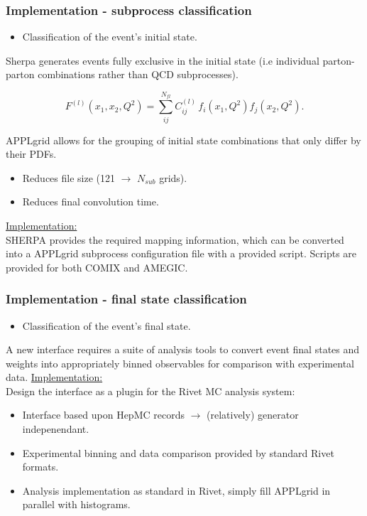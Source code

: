 \documentclass[10pt]{beamer}
\newcommand{\be}{\begin{equation*}}
\newcommand{\ee}{\end{equation*}}
\newcommand{\vso}{\vskip15pt}
\begin{document}
\begin{frame}
\frametitle{Implementation - subprocess classification}

\begin{itemize}
\item<1-> Classification of the event's initial state.
\end{itemize}

Sherpa generates events fully exclusive in the initial state
(i.e individual parton-parton combinations rather than QCD subprocesses).

\be F^{(l)}\left(x_1,x_2,Q^2\right) = \sum_{ij}^{N_{fl}} C^{(l)}_{ij} \, f_i\left(x_1,Q^2\right) f_j\left(x_2,Q^2\right). \ee

APPLgrid allows for the grouping of initial state combinations that only differ by their PDFs. 

\begin{itemize}
\item<1-> Reduces file size (121 $\to$ $N_{sub}$ grids).
\item<1-> Reduces final convolution time.
\end{itemize}
\vskip10pt

\underline{Implementation:}\\
\vskip4pt
SHERPA provides the required mapping information, which can be converted into
a APPLgrid subprocess configuration file with a provided script. Scripts are provided for both COMIX and AMEGIC.

\end{frame}

\begin{frame}
\frametitle{Implementation - final state classification}

\begin{itemize}
\item<1-> Classification of the event's final state.
\end{itemize}
\vskip10pt
A new interface requires a suite of analysis tools to convert event final states and weights into
appropriately binned observables for comparison with experimental data.
 \vso
 \underline{Implementation:}\\
\vskip4pt
Design the interface as a plugin for the Rivet MC analysis system:
\vskip5pt
\begin{itemize}
\item<1-> Interface based upon HepMC records $\to$ (relatively) generator indepenendant.
\item<1-> Experimental binning and data comparison provided by standard Rivet formats.
\item<1-> Analysis implementation as standard in Rivet, simply fill APPLgrid in parallel with histograms.
\end{itemize}

\end{frame}
\end{document}

